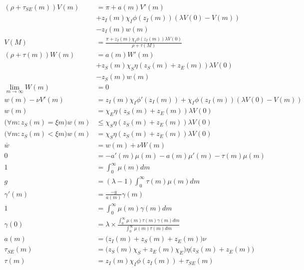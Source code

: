 \documentclass[12pt,english]{article}
\theoremstyle{remark}
\begin{document}
\begin{align}
(\rho + \tau_{SE}(m))V(m) &=  \pi + a(m) V'(m) \label{HJB_V}\\
						  &+ z_I(m)\chi_I \phi(z_I(m)) (\lambda V(0) - V(m)) \nonumber \\
						  &- z_I(m)w(m) \nonumber \\ 
 V(M) &= \frac{\pi + z_I(m)\chi_I \phi(z_I(m))\lambda V(0)}{\rho + \tau(M)} \label{HJB_V_Boundary} \\
(\rho + \tau(m)) W(m) &= a(m) W'(m) \label{HJB_W}\\
						&+ z_S(m)\chi_S\eta(z_S(m) + z_E(m))\lambda V(0) \nonumber \\
						&- z_S(m)w(m)  \nonumber	\\	
\lim_{m \to \infty} W(m) &= 0 \label{HJB_W_Boundary} \\ 										  
w(m) - \nu V'(m) &= z_I(m)\chi_I\phi'(z_I(m)) + \chi_I \phi(z_I(m)) (\lambda V(0) - V(m)) \label{HJB_V_FOC}\\
w(m) &= \chi_E\eta(z_S(m) + z_E(m)) \lambda V(0) \label{E_FreeEntry}\\ 
\Big(\forall m: z_S(m) = \xi m \Big) w(m) &\le \chi_S \eta(z_S(m) + z_E(m)) \lambda V(0) \label{HJB_W_Optimality1}\\
\Big(\forall m: z_S(m) < \xi m \Big) w(m) &= \chi_S \eta(z_S(m) + z_E(m)) \lambda V(0) \label{HJB_W_Optimality2}\\
\bar{w} &= w(m) + \nu W(m) \label{Indifference}\\
0 &= - a'(m)\mu(m) - a(m)\mu'(m) - \tau(m)\mu(m) \label{KF}\\
1 &= \int_{0}^{\infty} \mu(m) dm \label{KF_integral}\\
g &= (\lambda - 1) \int_{0}^{\infty} \tau(m) \mu(m) dm \label{growth_aggregation} \\
\gamma'(m) &= \frac{-g }{a(m)} \gamma(m) \label{gamma_firstorder}\\
1 &= \int_{0}^{\infty} \mu(m) \gamma(m) dm \label{gamma_integral}\\ 
\gamma(0) &= \lambda \times \frac{\int_{0}^{\infty} \mu(m) \tau(m) \gamma(m)  dm}{\int_{0}^{\infty} \mu(m) \tau(m) dm} \label{gamma_consistency}\\
a(m) &= \big( z_I(m) + z_S(m) + z_E(m) \big) \nu \label{a_def}\\
\tau_{SE}(m) &= \big(z_S(m) \chi_S + z_E(m) \chi_E \big) \eta \big(z_S(m) + z_E(m)\big) \label{tau_SE_def}\\
\tau(m) &= z_I(m) \chi_I \phi(z_I(m)) + \tau_{SE}(m)  \label{tau_def}
\end{align}
\end{document}
